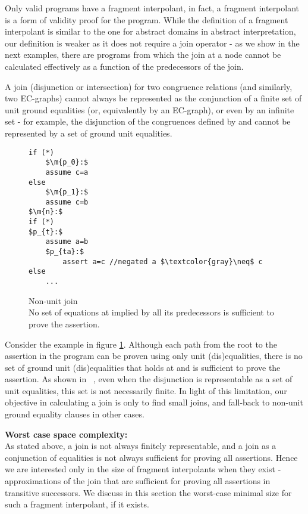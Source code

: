 Only valid programs have a fragment interpolant, in fact, a fragment interpolant is a form of validity proof for the program.
While the definition of a fragment interpolant is similar to the one for abstract domains in abstract interpretation, our definition is weaker as it does not require a join operator - as we show in the next examples, there are programs from which the join at a node cannot be calculated effectively as a function of the predecessors of the join.

A join (disjunction or intersection) for two congruence relations (and similarly, two EC-graphs) cannot always be represented as the conjunction of a finite set of unit ground equalities (or, equivalently by an EC-graph), or even by an infinite set - for example, the disjunction of the congruences defined by  and  cannot be represented by a set of ground unit equalities. 

\begin{figure}
\begin{lstlisting}
if (*)
	$\m{p_0}:$ 
	assume c=a
else
	$\m{p_1}:$ 
	assume c=b
$\m{n}:$
if (*)
$p_{t}:$
	assume a=b
	$p_{ta}:$
		assert a=c //negated a $\textcolor{gray}\neq$ c
else
	...
\end{lstlisting}
\caption{Non-unit join\\
No set of equations at  implied by all its predecessors is sufficient to prove the assertion.}
\label{snippet3.5}
\end{figure}

Consider the example in figure \ref{snippet3.5}.
Although each path from the root to the assertion in the program can be proven using only unit (dis)equalities, 
there is no set of ground unit (dis)equalities that holds at  and is sufficient to prove the assertion.
As shown in ~\cite{GulwaniTiwariNecula04}, even when the disjunction is representable as a set of unit equalities, this set is not necessarily finite. 
In light of this limitation, our objective in calculating a join is only to find small joins, and fall-back to non-unit ground equality clauses in other cases.

\noindent
\textbf{Worst case space complexity:}\\
As stated above, a join is not always finitely representable, and a join as a conjunction of equalities is not always sufficient for proving all assertions. Hence we are interested only in the size of fragment interpolants when they exist - approximations of the join that are sufficient for proving all assertions in transitive successors. We discuss in this section the worst-case minimal size for such a fragment interpolant, if it exists.

